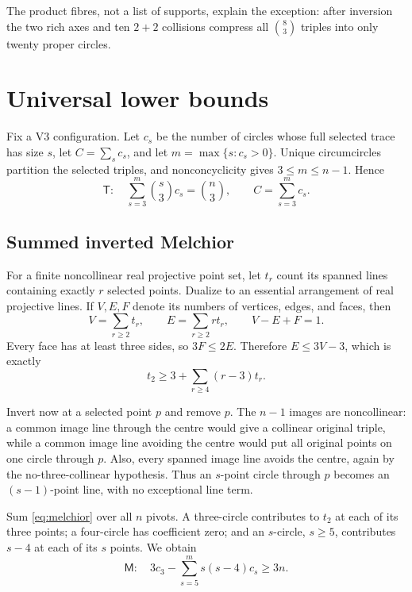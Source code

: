 \documentclass[11pt]{article}
\theoremstyle{definition}
\theoremstyle{remark}
\begin{document}
The product fibres, not a list of supports, explain the exception: after
inversion the two rich axes and ten \(2+2\) collisions compress all
\(\binom83\) triples into only twenty proper circles.

\section{Universal lower bounds}\label{sec:universal}

Fix a V3 configuration.  Let \(c_s\) be the number of circles whose full
selected trace has size \(s\), let \(C=\sum_s c_s\), and let
\(m=\max\{s:c_s>0\}\).  Unique circumcircles partition the selected triples,
and nonconcyclicity gives \(3\leq m\leq n-1\).  Hence
\begin{equation}\label{eq:T}
 \boxed{\mathsf T:\quad
 \sum_{s=3}^{m}\binom{s}{3}c_s=\binom n3},
 \qquad C=\sum_{s=3}^{m}c_s.
\end{equation}

\subsection{Summed inverted Melchior}

For a finite noncollinear real projective point set, let \(t_r\) count its
spanned lines containing exactly \(r\) selected points.  Dualize to an
essential arrangement of real projective lines.  If \(V,E,F\) denote its
numbers of vertices, edges, and faces, then
\[
 V=\sum_{r\geq2}t_r,\qquad E=\sum_{r\geq2}r t_r,
 \qquad V-E+F=1.
\]
Every face has at least three sides, so \(3F\leq2E\).  Therefore
\(E\leq3V-3\), which is exactly
\begin{equation}\label{eq:melchior}
 t_2\geq3+\sum_{r\geq4}(r-3)t_r.
\end{equation}

Invert now at a selected point \(p\) and remove \(p\).  The \(n-1\) images
are noncollinear: a common image line through the centre would give a
collinear original triple, while a common image line avoiding the centre
would put all original points on one circle through \(p\).  Also, every
spanned image line avoids the centre, again by the no-three-collinear
hypothesis.  Thus an \(s\)-point circle through \(p\) becomes an
\((s-1)\)-point line, with no exceptional line term.

Sum \eqref{eq:melchior} over all \(n\) pivots.  A three-circle contributes
to \(t_2\) at each of its three points; a four-circle has coefficient zero;
and an \(s\)-circle, \(s\geq5\), contributes \(s-4\) at each of its \(s\)
points.  We obtain
\begin{equation}\label{eq:M}
 \boxed{\mathsf M:\quad
 3c_3-\sum_{s=5}^{m}s(s-4)c_s\geq3n.}
\end{equation}
\end{document}
